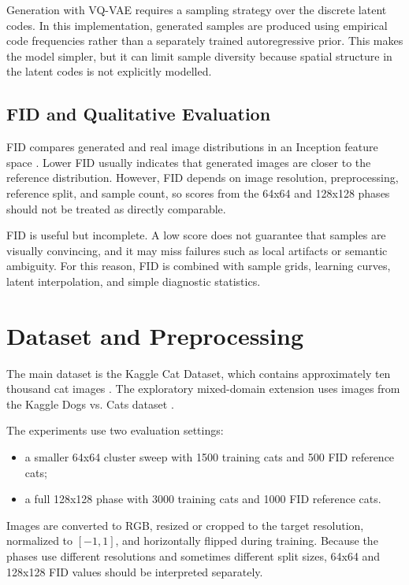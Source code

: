 \documentclass[11pt,a4paper]{article}
\begin{document}
Generation with VQ-VAE requires a sampling strategy over the discrete latent codes. In this implementation, generated samples are produced using empirical code frequencies rather than a separately trained autoregressive prior. This makes the model simpler, but it can limit sample diversity because spatial structure in the latent codes is not explicitly modelled.

\subsection{FID and Qualitative Evaluation}

FID compares generated and real image distributions in an Inception feature space \cite{heusel2017fid}. Lower FID usually indicates that generated images are closer to the reference distribution. However, FID depends on image resolution, preprocessing, reference split, and sample count, so scores from the 64x64 and 128x128 phases should not be treated as directly comparable.

FID is useful but incomplete. A low score does not guarantee that samples are visually convincing, and it may miss failures such as local artifacts or semantic ambiguity. For this reason, FID is combined with sample grids, learning curves, latent interpolation, and simple diagnostic statistics.

\section{Dataset and Preprocessing}

The main dataset is the Kaggle Cat Dataset, which contains approximately ten thousand cat images \cite{kagglecats}. The exploratory mixed-domain extension uses images from the Kaggle Dogs vs. Cats dataset \cite{kaggledogsvscats}.

The experiments use two evaluation settings:

\begin{itemize}[leftmargin=*]
    \item a smaller 64x64 cluster sweep with 1500 training cats and 500 FID reference cats;
    \item a full 128x128 phase with 3000 training cats and 1000 FID reference cats.
\end{itemize}

Images are converted to RGB, resized or cropped to the target resolution, normalized to $[-1,1]$, and horizontally flipped during training. Because the phases use different resolutions and sometimes different split sizes, 64x64 and 128x128 FID values should be interpreted separately.
\end{document}
